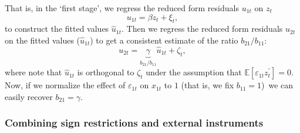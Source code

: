 \documentclass[10pt]{article}
\begin{document}
That is, in the `first stage', we regress the reduced form residuals $u_{1t}$
on $z_{t}$%
\begin{equation}
u_{1t}=\beta z_{t}+\xi _{t},  \label{eqapp:first_stage}
\end{equation}%
to construct the fitted values $\hat{u}_{1t}$. Then we regress the reduced
form residuals $u_{2t}$ on the fitted values ($\hat{u}_{1t}$) to get a
consistent estimate of the ratio $b_{21}/b_{11}$:%
\begin{equation}
u_{2t}=\underset{b_{21}/b_{11}}{\underbrace{\gamma }}\hat{u}_{1t}+\zeta _{t},
\label{eqapp:second_stage}
\end{equation}%
where note that $\hat{u}_{1t}$ is orthogonal to $\zeta _{t}$ under the
assumption that $\mathbb{E}[\varepsilon _{1t}z_{t}^{\prime }]=0$. Now, if we
normalize the effect of $\varepsilon _{1t}$ on $x_{1t}$ to $1$ (that is, we
fix $b_{11}=1$)\ we can easily recover $b_{21}=\gamma $.

\subsubsection{Combining sign restrictions and external instruments}
\end{document}
